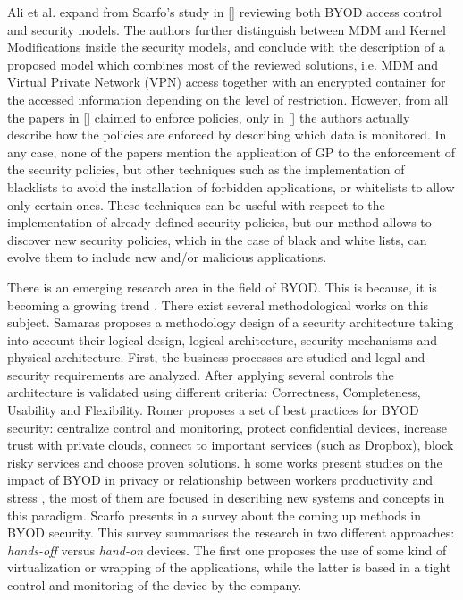 Ali et al. expand from Scarfo's study in [\cite{ali2015analysis}] reviewing both BYOD access control  and security models. The authors further distinguish between MDM and Kernel Modifications inside the security models, and conclude with the description of a proposed model which combines most of the reviewed solutions, i.e. MDM and Virtual Private Network (VPN) access together with an encrypted container for the accessed information depending on the level of restriction. However, from all the papers in [\cite{ali2015analysis}] claimed to enforce policies, only in [\cite{rhee2013high}] the authors actually describe how the policies are enforced by describing which data is monitored. In any case, none of the papers mention the application of GP to the enforcement of the security policies, but other techniques such as the implementation of
blacklists to avoid the installation of forbidden applications, or whitelists to allow only certain ones. These techniques can be useful with respect to the implementation of already defined security policies, but our method allows to discover new security policies, which in the case of black and white lists, can evolve them to include new and/or malicious applications.

There is an emerging research area in the field of BYOD. This is because, it is becoming a growing trend \cite{Garba15organisational}. There exist several methodological works on this subject. Samaras \cite{Samaras13SaaS} proposes a methodology design of a security architecture taking into account their logical design, logical architecture, security mechanisms and physical architecture. First, the business processes are studied and legal and security requirements are analyzed. After applying several controls the architecture is validated using different criteria: Correctness, Completeness, Usability and Flexibility. Romer \cite{Romer14BestPractices} proposes a set of best practices for BYOD security: centralize control and monitoring, protect confidential devices, increase trust with private clouds, connect to important services (such as Dropbox), block risky services and choose proven solutions.
h some works present studies on the impact of BYOD in privacy \cite{Miller12Privacy} or relationship between workers productivity and stress \cite{Haejung12Door}, the most of them are focused in describing new systems and concepts in this paradigm. Scarfo presents in \cite{Scarfo12survey} a survey about the coming up methods in BYOD security. This survey summarises the research in two different approaches: {\em hands-off} versus {\em hand-on} devices. The first one proposes the use of some kind of virtualization or wrapping of the applications, while the latter is based in a tight control and monitoring of the device by the company.

